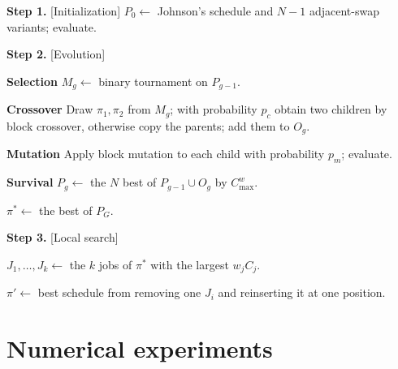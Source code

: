 \documentclass[12pt]{article} \textheight=24.5cm \textwidth=16.5cm \parskip = 0.165cm
\let\origsection\section
\renewcommand{\section}{\FloatBarrier\origsection}
\begin{document}
\begin{sloppypar}
        \begin{algorithm}[H]
            \small
            \linespread{1.2}\selectfont
            \SetAlgoLined
            \DontPrintSemicolon
            \caption{The weight-block genetic algorithm (WBGA) for $F2 \mid \mid C_{\max}^w$} \label{Alg-GA}
            
            \BlankLine
            \textbf{Step 1.} [Initialization] $P_0\gets$ Johnson's schedule and $N-1$ adjacent-swap variants; evaluate. \;
            
            \textbf{Step 2.} [Evolution] 
            {
                \textbf{Selection} $M_g\gets$ binary tournament on $P_{g-1}$. \;
                
                \textbf{Crossover} 
                {
                    Draw $\pi_1,\pi_2$ from $M_g$; with probability $p_c$ obtain two children by block crossover, otherwise copy the parents; add them to $O_g$. \;
                }
                
                \textbf{Mutation} Apply block mutation to each child with probability $p_m$; evaluate. \;
                
                \textbf{Survival} $P_g\gets$ the $N$ best of $P_{g-1}\cup O_g$ by $C_{\max}^w$. \;
            }
            
            $\pi^{*}\gets$ the best of $P_G$. \;
            
            \textbf{Step 3.} [Local search] 
            {
                $J_1,\ldots,J_k\gets$ the $k$ jobs of $\pi^{*}$ with the largest $w_jC_j$. \;
                
                $\pi'\gets$ best schedule from removing one $J_i$ and reinserting it at one position. \;
                
            }
        \end{algorithm}
        
        
        \section{Numerical experiments} \label{sec:experiments}
        

\end{sloppypar}
\end{document}

